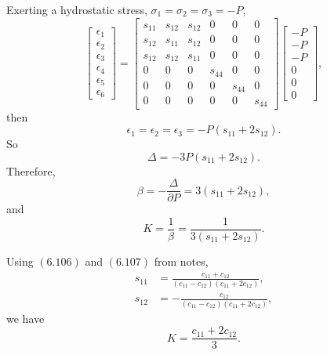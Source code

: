 \documentclass[12pt]{article}
\begin{document}
Exerting a hydrostatic stress, $\sigma_1 = \sigma_2 = \sigma_3 = -P$,
\begin{equation}
	\begin{bmatrix}
		\epsilon_1 \\
		\epsilon_2 \\
		\epsilon_3 \\
		\epsilon_4 \\
		\epsilon_5 \\
		\epsilon_6
	\end{bmatrix}
	=
	\begin{bmatrix}
		s_{11} & s_{12} & s_{12} & 0      & 0      & 0      \\
		s_{12} & s_{11} & s_{12} & 0      & 0      & 0      \\
		s_{12} & s_{12} & s_{11} & 0      & 0      & 0      \\
		0      & 0      & 0      & s_{44} & 0      & 0      \\
		0      & 0      & 0      & 0      & s_{44} & 0      \\
		0      & 0      & 0      & 0      & 0      & s_{44}
	\end{bmatrix}
	\begin{bmatrix}
		-P \\
		-P \\
		-P \\
		0  \\
		0  \\
		0
	\end{bmatrix},
\end{equation}
then
\begin{equation}
	\epsilon_1 = \epsilon_2 = \epsilon_3 = -P (s_{11} + 2 s_{12}).
\end{equation}
So
\begin{equation}
	\Delta = -3P (s_{11} + 2 s_{12}).
\end{equation}
Therefore,
\begin{equation}
	\beta = -\frac{ \Delta }{ \partial P } = 3(s_{11} + 2 s_{12}),
\end{equation}
and
\begin{equation}
	K = \frac{ 1 }{ \beta } = \frac{ 1 }{ 3(s_{11} + 2 s_{12}) }.
\end{equation}

Using $(6.106)$ and $(6.107)$ from notes,
\begin{align}
	s_{11} & = \frac{c_{11}+c_{12}}{(c_{11} - c_{12})(c_{11}+2c_{12})}, \\
	s_{12} & = -\frac{c_{12}}{(c_{11} - c_{12})(c_{11}+2c_{12})},
\end{align}
we have
\begin{equation}
	K = \frac{ c_{11} + 2 c_{12} }{ 3 }.
\end{equation}
\end{document}
